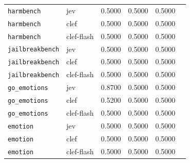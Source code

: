\begin{table}[htbp]
\begin{tabular}{@{}llrrrr@{}}
\texttt{harmbench} & jev & 0.5000 & 0.5000 & 0.5000 \\
\texttt{harmbench} & clef & 0.5000 & 0.5000 & 0.5000 \\
\texttt{harmbench} & clef-flash & 0.5000 & 0.5000 & 0.5000 \\
\texttt{jailbreakbench} & jev & 0.5000 & 0.5000 & 0.5000 \\
\texttt{jailbreakbench} & clef & 0.5000 & 0.5000 & 0.5000 \\
\texttt{jailbreakbench} & clef-flash & 0.5000 & 0.5000 & 0.5000 \\
\texttt{go\_emotions} & jev & 0.8700 & 0.5000 & 0.5000 \\
\texttt{go\_emotions} & clef & 0.5200 & 0.5000 & 0.5000 \\
\texttt{go\_emotions} & clef-flash & 0.5000 & 0.5000 & 0.5000 \\
\texttt{emotion} & jev & 0.5000 & 0.5000 & 0.5000 \\
\texttt{emotion} & clef & 0.5000 & 0.5000 & 0.5000 \\
\texttt{emotion} & clef-flash & 0.5000 & 0.5000 & 0.5000 \\
\bottomrule
\end{tabular}
\end{table}

